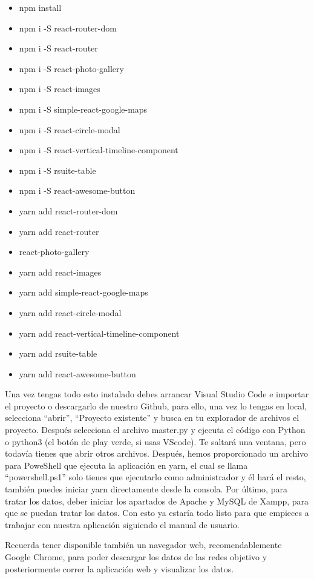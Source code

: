 \begin{itemize}
	\item npm install
	\item npm i -S react-router-dom
	\item npm i -S react-router
	\item npm i -S react-photo-gallery
	\item npm i -S react-images
	\item npm i -S simple-react-google-maps
	\item npm i -S react-circle-modal
	\item npm i -S react-vertical-timeline-component
	\item npm i -S rsuite-table
	\item npm i -S react-awesome-button
	\item yarn add react-router-dom
	\item yarn add react-router
	\item react-photo-gallery
	\item yarn add react-images
	\item yarn add simple-react-google-maps
	\item yarn add react-circle-modal
	\item yarn add react-vertical-timeline-component
	\item yarn add rsuite-table
	\item yarn add react-awesome-button
\end{itemize}

Una vez tengas todo esto instalado debes arrancar Visual Studio Code e importar el proyecto o descargarlo de nuestro Github, para ello, una vez lo tengas en local, selecciona ``abrir'', ``Proyecto existente'' y busca en tu explorador de archivos el proyecto. Después selecciona el archivo master.py y ejecuta el código con Python o python3 (el botón de play verde, si usas VScode). Te saltará una ventana, pero todavía tienes que abrir otros archivos. Después, hemos proporcionado un archivo para PoweShell que ejecuta la aplicación en yarn, el cual se llama ``powershell.ps1'' solo tienes que ejecutarlo como administrador y él hará el resto, también puedes iniciar yarn directamente desde la consola. Por último, para tratar los datos, deber iniciar los apartados de Apache y MySQL de Xampp, para que se puedan tratar los datos. Con esto ya estaría todo listo para que empieces a trabajar con nuestra aplicación siguiendo el manual de usuario.

Recuerda tener disponible también un navegador web, recomendablemente Google Chrome, para poder descargar los datos de las redes objetivo y posteriormente correr la aplicación web y visualizar los datos.

